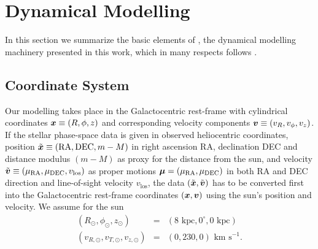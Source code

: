 \section{Dynamical Modelling}

%
%
%


In this section we summarize the basic elements of \RM{}, the dynamical modelling machinery presented in this work, which in many respects follows \citet{bov13}.

\subsection{Coordinate System} \label{sec:coordinates}

Our modelling takes place in the Galactocentric rest-frame with cylindrical coordinates $\boldsymbol{x} \equiv (R,\phi,z)$ and corresponding velocity components $\boldsymbol{v} \equiv (v_R,v_\phi,v_z)$. If the stellar phase-space data is given in observed heliocentric coordinates, position $\tilde{\boldsymbol{x}} \equiv(\text{RA},\text{DEC},m-M)$ in right ascension RA, declination DEC and distance modulus $(m-M)$ as proxy for the distance from the sun, and velocity $\tilde{\boldsymbol{v}} \equiv (\mu_\text{RA},\mu_\text{DEC},v_\text{los})$ as proper motions $\boldsymbol{\mu}=(\mu_\text{RA},\mu_\text{DEC})$  in both RA and DEC direction and line-of-sight velocity $v_\text{los}$, the data $(\tilde{\boldsymbol{x}},\tilde{\boldsymbol{v}})$ has to be converted first into the Galactocentric rest-frame coordinates $(\boldsymbol{x},\boldsymbol{v})$ using the sun's position and velocity. We assume for the sun
\begin{eqnarray*}
(R_\odot,\phi_\odot,z_\odot) &=&(8 \text{ kpc}, 0^\circ, 0 \text{ kpc})\\
(v_{R,\odot},v_{T,\odot},v_{z,\odot}) &=& (0,230,0) \text{ km s}^{-1}.
\end{eqnarray*}

